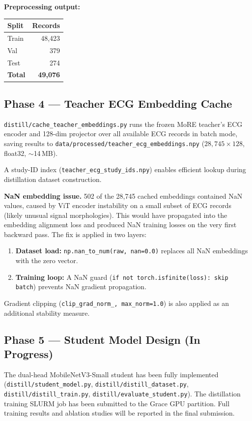 \documentclass[sigconf,nonacm]{acmart}
\begin{document}
\textbf{Preprocessing output:}
\begin{center}
\begin{tabular}{lr}
Split & Records \\
\hline
Train & 48,423 \\
Val & 379 \\
Test & 274 \\
\textbf{Total} & \textbf{49,076} \\
\end{tabular}
\end{center}

\subsection{Phase 4 — Teacher ECG Embedding Cache}

\texttt{distill/cache\_teacher\_embeddings.py} runs the frozen MoRE
teacher's ECG encoder and 128-dim projector over all available ECG
records in batch mode, saving results to
\texttt{data/processed/teacher\_ecg\_embeddings.npy}
($28{,}745 \times 128$, float32, $\sim$14\,MB).

A study-ID index (\texttt{teacher\_ecg\_study\_ids.npy}) enables
efficient lookup during distillation dataset construction.

\textbf{NaN embedding issue.}
502 of the 28,745 cached embeddings contained NaN values, caused by
ViT encoder instability on a small subset of ECG records (likely
unusual signal morphologies). This would have propagated into the
embedding alignment loss and produced NaN training losses on the very
first backward pass. The fix is applied in two layers:
\begin{enumerate}[noitemsep]
  \item \textbf{Dataset load:} \texttt{np.nan\_to\_num(raw, nan=0.0)} replaces all NaN embeddings with the zero vector.
  \item \textbf{Training loop:} A NaN guard (\texttt{if not torch.isfinite(loss): skip batch}) prevents NaN gradient propagation.
\end{enumerate}
Gradient clipping (\texttt{clip\_grad\_norm\_, max\_norm=1.0}) is also
applied as an additional stability measure.

\subsection{Phase 5 — Student Model Design (In Progress)}

The dual-head MobileNetV3-Small student has been fully implemented
(\texttt{distill/student\_model.py}, \texttt{distill/distill\_dataset.py},
\texttt{distill/distill\_train.py}, \texttt{distill/evaluate\_student.py}).
The distillation training SLURM job has been submitted to the Grace
GPU partition. Full training results and ablation studies will be
reported in the final submission.
\end{document}

